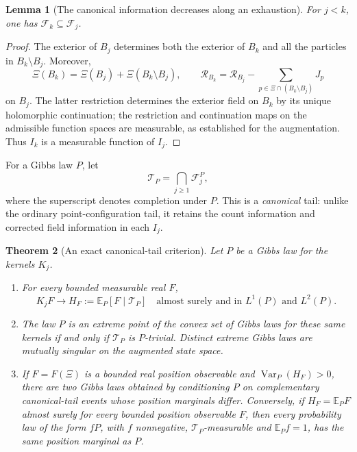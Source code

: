 \documentclass[11pt,a4paper]{article}
\numberwithin{equation}{section}
\newtheorem{theorem}{Theorem}[section]
\newtheorem{lemma}[theorem]{Lemma}
\theoremstyle{definition}
\theoremstyle{remark}
\newcommand{\E}{\mathbb E}
\begin{document}
\begin{lemma}[The canonical information decreases along an exhaustion]
\label{lem:canonical-decreasing-information}
For $j<k$, one has $\mathcal F_k\subseteq\mathcal F_j$.
\end{lemma}
\begin{proof}
The exterior of $B_j$ determines both the exterior of $B_k$ and
all the particles in $B_k\setminus B_j$. Moreover,
\[
 \Xi(B_k)=\Xi(B_j)+\Xi(B_k\setminus B_j),\qquad
 \mathcal R_{B_k}=\mathcal R_{B_j}
                  -\sum_{p\in\Xi\cap(B_k\setminus B_j)}J_p
\]
on $B_j$. The latter restriction determines the exterior field on
$B_k$ by its unique holomorphic continuation; the restriction and
continuation maps on the admissible function spaces are measurable,
as established for the augmentation. Thus $I_k$ is a measurable
function of $I_j$.
\end{proof}

For a Gibbs law $P$, let
\[
 \mathcal T_P=\bigcap_{j\ge1}\mathcal F_j^{P},
\]
where the superscript denotes completion under $P$. This is a
\emph{canonical} tail: unlike the ordinary point-configuration tail,
it retains the count information and corrected field information in
each $I_j$.

\begin{theorem}[An exact canonical-tail criterion]
\label{thm:canonical-tail-extremality}
Let $P$ be a Gibbs law for the kernels $K_j$.
\begin{enumerate}
\item For every bounded measurable real $F$,
\[
 K_jF\longrightarrow H_F:=\E_P[F\mid\mathcal T_P]
       \quad\text{almost surely and in }L^1(P)\text{ and }L^2(P).
\]
\item The law $P$ is an extreme point of the convex set of Gibbs
laws for these same kernels if and only if $\mathcal T_P$ is
$P$-trivial. Distinct extreme Gibbs laws are mutually singular on
the augmented state space.
\item If $F=F(\Xi)$ is a bounded real position observable and
$\operatorname{Var}_P(H_F)>0$, there are two Gibbs laws obtained by
conditioning $P$ on complementary canonical-tail events whose
position marginals differ. Conversely, if $H_F=\E_PF$ almost
surely for every bounded position observable $F$, then every
probability law of the form $fP$, with $f$ nonnegative,
$\mathcal T_P$-measurable and $\E_Pf=1$, has the same position
marginal as $P$.
\end{enumerate}
\end{theorem}
\end{document}
